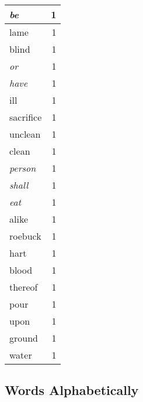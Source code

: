 \begin{center}
\begin{longtable}{l|r}
\emph{be} & 1 \\ \hline
lame & 1 \\ \hline
blind & 1 \\ \hline
\emph{or} & 1 \\ \hline
\emph{have} & 1 \\ \hline
ill & 1 \\ \hline
sacrifice & 1 \\ \hline
unclean & 1 \\ \hline
clean & 1 \\ \hline
\emph{person} & 1 \\ \hline
\emph{shall} & 1 \\ \hline
\emph{eat} & 1 \\ \hline
alike & 1 \\ \hline
roebuck & 1 \\ \hline
hart & 1 \\ \hline
blood & 1 \\ \hline
thereof & 1 \\ \hline
pour & 1 \\ \hline
upon & 1 \\ \hline
ground & 1 \\ \hline
water & 1 \\ \hline
\end{longtable}
\end{center}



\normalsize



\subsection{Words Alphabetically}

